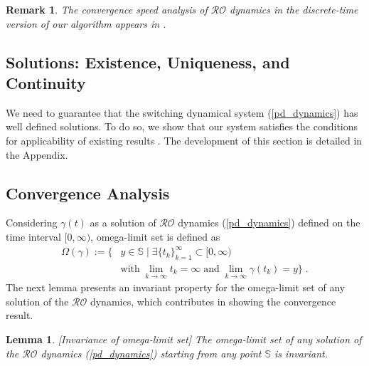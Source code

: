 \documentclass[journal,twoside,web]{ieeecolor}
\newtheorem{lemma}{Lemma}
\newtheorem{remark}{Remark}
\begin{document}
\begin{remark} \label{convergence_speed}
The convergence speed analysis of $\mathcal{RO}$ dynamics in the discrete-time version of our algorithm appears in \cite{ebrahimi2019cdc}.
\end{remark}

\subsection{Solutions: Existence, Uniqueness, and Continuity}
We need to guarantee that the switching dynamical system (\ref{pd_dynamics}) has well defined solutions.
To do so, we show that our system satisfies the conditions for applicability of existing results \cite{cherukuri2016}. The development of this section is detailed in the Appendix.

\subsection{Convergence Analysis}
Considering $\gamma(t)$ as a solution of $\mathcal{RO}$ dynamics (\ref{pd_dynamics}) defined on the time interval $[0,\infty)$, omega-limit set is defined as
\begin{align} \label{omega_limit}
\Omega(\gamma):=\{& y \in \mathbb S \;|\; \exists \{t_k\}_{k=1}^\infty \subset [0,\infty) \nonumber\\
&\text{with}\; \lim_{k \rightarrow \infty} t_k=\infty \;\text{and}\; \lim_{k \rightarrow \infty} \gamma(t_k)=y\}\;.
\end{align}
The next lemma presents an invariant property for the omega-limit set of any solution of the $\mathcal{RO}$ dynamics, which contributes in showing the convergence result.
\begin{lemma}\cite[Lemma~4.4]{cherukuri2016}[Invariance of omega-limit set]
The omega-limit set of any solution of the $\mathcal{RO}$ dynamics (\ref{pd_dynamics}) starting from any point $\mathbb S$ is invariant.
\label{omega_invariance}
\end{lemma}
\end{document}
